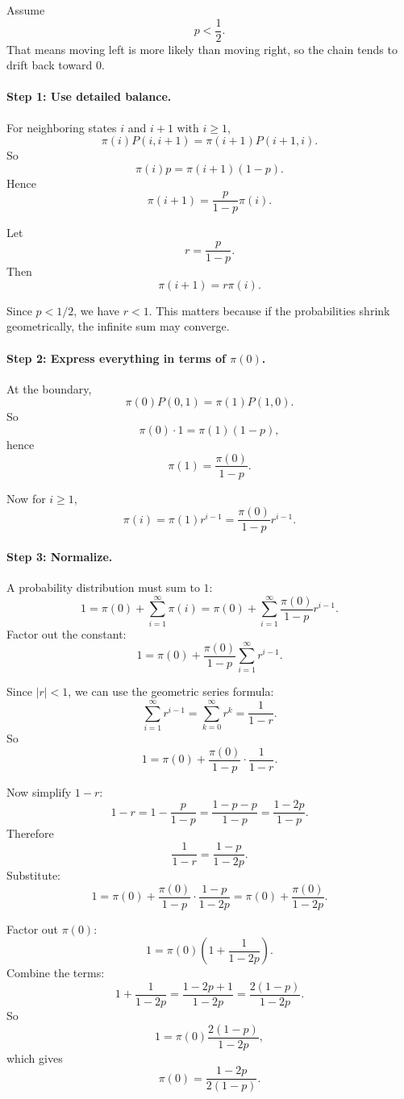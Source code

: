 \documentclass[11pt]{article}
\begin{document}
Assume
\[
p<\frac12.
\]
That means moving left is more likely than moving right, so the chain tends to drift back toward $0$.

\paragraph{Step 1: Use detailed balance.}

For neighboring states $i$ and $i+1$ with $i\ge1$,
\[
\pi(i)P(i,i+1)=\pi(i+1)P(i+1,i).
\]
So
\[
\pi(i)p=\pi(i+1)(1-p).
\]
Hence
\[
\pi(i+1)=\frac{p}{1-p}\pi(i).
\]

Let
\[
r=\frac{p}{1-p}.
\]
Then
\[
\pi(i+1)=r\pi(i).
\]

Since $p<1/2$, we have $r<1$.
This matters because if the probabilities shrink geometrically, the infinite sum may converge.

\paragraph{Step 2: Express everything in terms of $\pi(0)$.}

At the boundary,
\[
\pi(0)P(0,1)=\pi(1)P(1,0).
\]
So
\[
\pi(0)\cdot 1=\pi(1)(1-p),
\]
hence
\[
\pi(1)=\frac{\pi(0)}{1-p}.
\]

Now for $i\ge1$,
\[
\pi(i)=\pi(1)r^{i-1}
=\frac{\pi(0)}{1-p}r^{i-1}.
\]

\paragraph{Step 3: Normalize.}

A probability distribution must sum to $1$:
\[
1=\pi(0)+\sum_{i=1}^{\infty}\pi(i)
=\pi(0)+\sum_{i=1}^{\infty}\frac{\pi(0)}{1-p}r^{i-1}.
\]
Factor out the constant:
\[
1=\pi(0)+\frac{\pi(0)}{1-p}\sum_{i=1}^{\infty}r^{i-1}.
\]

Since $|r|<1$, we can use the geometric series formula:
\[
\sum_{i=1}^{\infty}r^{i-1}=\sum_{k=0}^{\infty}r^k=\frac{1}{1-r}.
\]
So
\[
1=\pi(0)+\frac{\pi(0)}{1-p}\cdot \frac{1}{1-r}.
\]

Now simplify $1-r$:
\[
1-r=1-\frac{p}{1-p}
=\frac{1-p-p}{1-p}
=\frac{1-2p}{1-p}.
\]
Therefore
\[
\frac{1}{1-r}=\frac{1-p}{1-2p}.
\]
Substitute:
\[
1=\pi(0)+\frac{\pi(0)}{1-p}\cdot \frac{1-p}{1-2p}
=\pi(0)+\frac{\pi(0)}{1-2p}.
\]

Factor out $\pi(0)$:
\[
1=\pi(0)\left(1+\frac{1}{1-2p}\right).
\]
Combine the terms:
\[
1+\frac{1}{1-2p}
=\frac{1-2p+1}{1-2p}
=\frac{2(1-p)}{1-2p}.
\]
So
\[
1=\pi(0)\frac{2(1-p)}{1-2p},
\]
which gives
\[
\pi(0)=\frac{1-2p}{2(1-p)}.
\]
\end{document}

